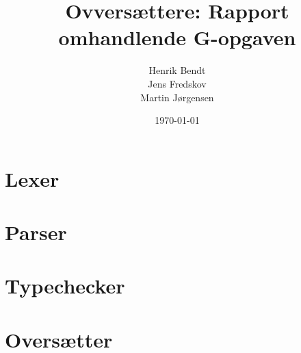 \documentclass[a2paper, 10pt]{article}
\author{Henrik Bendt \\ Jens Fredskov \\ Martin Jørgensen}
\title{Ovversættere: Rapport omhandlende G-opgaven}
\date{\today}
\begin{document}
\maketitle
\pagebreak

\section{Lexer}

\section{Parser}

\section{Typechecker}

\section{Oversætter}
\end{document}
